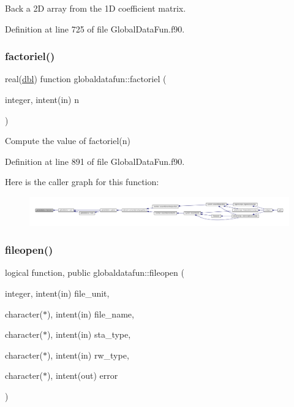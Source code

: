 Back a 2D array from the 1D coefficient matrix. 



Definition at line 725 of file Global\+Data\+Fun.\+f90.

\mbox{\label{namespaceglobaldatafun_a0ae214f4b91d5705b4d0107913efe369}} 
\subsubsection{\texorpdfstring{factoriel()}{factoriel()}}
{\footnotesize\ttfamily real(\hyperlink{namespaceglobaldatafun_a5008801201dd34f2af8eae07756befb4}{dbl}) function globaldatafun\+::factoriel (\begin{DoxyParamCaption}\item[{integer, intent(in)}]{n }\end{DoxyParamCaption})\hspace{0.3cm}{\ttfamily [private]}}



Compute the value of factoriel(n) 



Definition at line 891 of file Global\+Data\+Fun.\+f90.

Here is the caller graph for this function\+:\nopagebreak
\begin{figure}[H]
\begin{center}
\leavevmode
\includegraphics[width=350pt]{namespaceglobaldatafun_a0ae214f4b91d5705b4d0107913efe369_icgraph}
\end{center}
\end{figure}
\mbox{\label{namespaceglobaldatafun_a384e8e6270f765a8e68a8c65ac8ae9d6}} 
\subsubsection{\texorpdfstring{fileopen()}{fileopen()}}
{\footnotesize\ttfamily logical function, public globaldatafun\+::fileopen (\begin{DoxyParamCaption}\item[{integer, intent(in)}]{file\+\_\+unit,  }\item[{character($\ast$), intent(in)}]{file\+\_\+name,  }\item[{character($\ast$), intent(in)}]{sta\+\_\+type,  }\item[{character($\ast$), intent(in)}]{rw\+\_\+type,  }\item[{character($\ast$), intent(out)}]{error }\end{DoxyParamCaption})}



